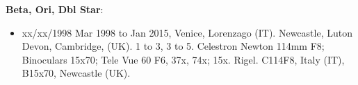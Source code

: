 {\bf Beta, Ori, Dbl Star}:
\begin{itemize}
\item xx/xx/1998 Mar 1998 to Jan 2015, Venice, Lorenzago (IT). Newcastle, Luton Devon, Cambridge, (UK). 1 to 3, 3 to 5. Celestron Newton 114mm F8; Binoculars 15x70; Tele Vue 60 F6, 37x, 74x; 15x. Rigel. C114F8, Italy (IT), B15x70, Newcastle (UK).
\end{itemize}
